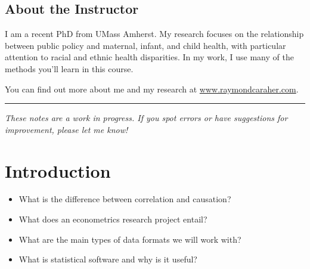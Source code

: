 \documentclass[
  letterpaper,
  DIV=11,
  numbers=noendperiod]{scrreprt}
\providecommand{\tightlist}{%
  \setlength{\itemsep}{0pt}\setlength{\parskip}{0pt}}
\begin{document}
\section*{About the Instructor}\label{about-the-instructor}


I am a recent PhD from UMass Amherst. My research focuses on the
relationship between public policy and maternal, infant, and child
health, with particular attention to racial and ethnic health
disparities. In my work, I use many of the methods you'll learn in this
course.

You can find out more about me and my research at
\href{https://www.raymondcaraher.com}{www.raymondcaraher.com}.

\begin{center}\rule{0.5\linewidth}{0.5pt}\end{center}

\emph{These notes are a work in progress. If you spot errors or have
suggestions for improvement, please let me know!}


\chapter{Introduction}\label{sec-introduction}

\begin{tcolorbox}[enhanced jigsaw, arc=.35mm, bottomrule=.15mm, bottomtitle=1mm, breakable, colback=white, colbacktitle=quarto-callout-tip-color!10!white, colframe=quarto-callout-tip-color-frame, coltitle=black, left=2mm, leftrule=.75mm, opacityback=0, opacitybacktitle=0.6, rightrule=.15mm, title=\textcolor{quarto-callout-tip-color}{\faLightbulb}\hspace{0.5em}{\textbf{Key Questions}}, titlerule=0mm, toprule=.15mm, toptitle=1mm]

\begin{itemize}
\tightlist
\item
  What is the difference between correlation and causation?
\item
  What does an econometrics research project entail?
\item
  What are the main types of data formats we will work with?
\item
  What is statistical software and why is it useful?
\end{itemize}

\end{tcolorbox}
\end{document}
